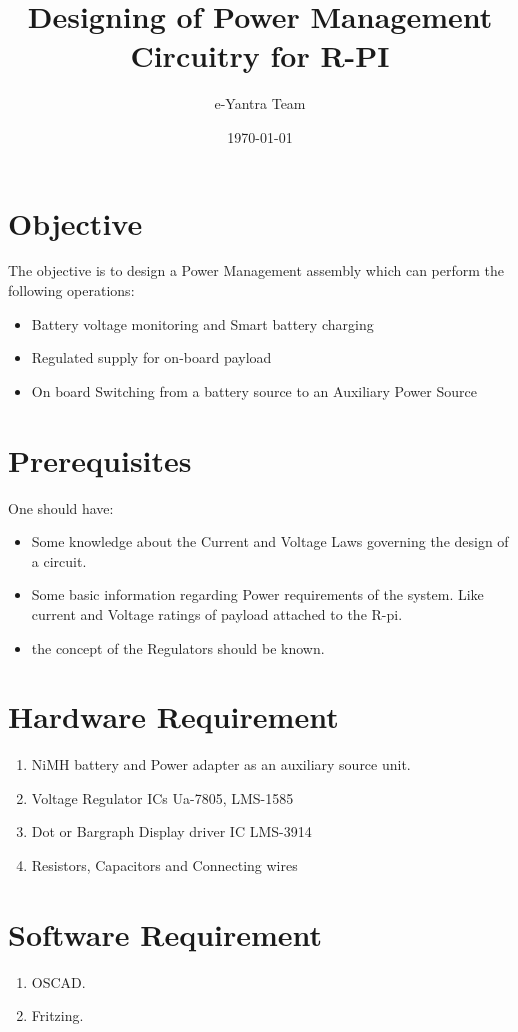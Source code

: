 \documentclass[11pt,a4paper]{article}
\title{Designing of Power Management Circuitry for R-PI}
\author{e-Yantra Team}
\date{\today}
\begin{document}
	\maketitle
	\newpage
	\tableofcontents
	\newpage
	
\section{Objective}
The objective is to design a Power Management assembly which can perform the following operations:
		\begin{itemize}
			\item Battery voltage monitoring and Smart battery charging
			\item Regulated supply for on-board payload
			\item On board Switching from a battery source to an Auxiliary Power Source
		\end{itemize} 
	\section{Prerequisites}
	One should have:
	\begin{itemize}
		\item Some knowledge about the Current and Voltage Laws governing the design of a circuit.
		\item Some basic information regarding Power requirements of the system. Like current and  Voltage ratings of payload attached to the R-pi.
        \item the concept of the Regulators should be known.
	\end{itemize}

	\section{Hardware Requirement}
	\begin{enumerate}
		\item NiMH battery and Power adapter as an auxiliary source unit.
		\item Voltage Regulator ICs Ua-7805, LMS-1585
		\item Dot or Bargraph Display driver IC LMS-3914 
		\item Resistors, Capacitors and Connecting wires
	\end{enumerate}
	
	\section{Software Requirement}
	\begin{enumerate}
		\item OSCAD.
		\item Fritzing.
	\end{enumerate}	
	
\end{document}
